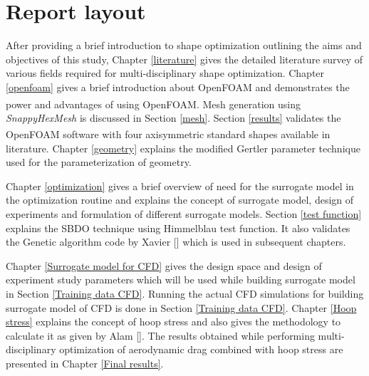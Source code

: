 \section{Report layout}
\label{layout}

After providing a brief introduction to shape optimization outlining the aims and objectives of this study, Chapter \ref{literature} gives the detailed literature survey of various fields required for multi-disciplinary shape optimization. Chapter \ref{openfoam} gives a brief introduction about OpenFOAM and demonstrates the power and advantages of using OpenFOAM\textsuperscript{\textregistered}.
Mesh generation using \textit{SnappyHexMesh} is discussed in Section \ref{mesh}. Section \ref{results} validates the OpenFOAM\textsuperscript{\textregistered} software with four axisymmetric standard shapes available in literature. Chapter \ref{geometry}  explains the modified Gertler parameter technique used for the parameterization of geometry.

Chapter \ref{optimization} gives a brief overview of need for the surrogate model in the optimization routine and explains the concept of surrogate model, design of experiments and formulation of different surrogate models. Section \ref{test function} explains the SBDO technique using Himmelblau test function. It also validates the Genetic algorithm code by Xavier [] which is used in subsequent chapters.

Chapter \ref{Surrogate model for CFD} gives the design space and design of experiment study parameters which will be used while building surrogate model in Section \ref{Training data CFD}. Running the actual CFD simulations for building surrogate model of CFD is done in Section \ref{Training data CFD}. Chapter \ref{Hoop stress} explains the concept of hoop stress and also gives the methodology to calculate it as given by Alam []. The results obtained while performing multi-disciplinary optimization of aerodynamic drag combined with hoop stress are presented in Chapter \ref{Final results}.

